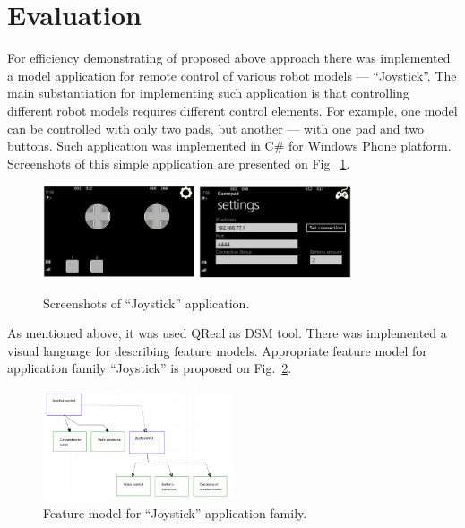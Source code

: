 \documentclass[conference]{IEEEtran}
\begin{document}
\section{Evaluation}
\label{chapter:evaluation}
For efficiency demonstrating of proposed above approach there was implemented a model application for  remote control of various robot models --- ``Joystick''. The main substantiation for implementing such application is that controlling different robot models requires different control elements. For example, one model can be controlled with only two pads, but another --- with one pad and two buttons. Such application was implemented in C\# for Windows Phone platform. Screenshots of this simple application are presented on Fig.~\ref{image:joystick}. 

\begin{figure}[t]
	\centering
	\includegraphics[width=0.4\textwidth]{joystick1.png}
	\includegraphics[width=0.4\textwidth]{joystick2.png}
	\caption{Screenshots of ``Joystick'' application.}
	\label{image:joystick}
\end{figure}

As mentioned above, it was used QReal as DSM tool. There was implemented a visual language for describing feature models. Appropriate feature model for application family ``Joystick'' is proposed on Fig.~\ref{image:joystickFeatureModel}.

\begin{figure}[H]
	\centering
	\includegraphics[width=0.5\textwidth]{joystickFeatureModel.png}
	\caption{Feature model for ``Joystick'' application family.}
	\label{image:joystickFeatureModel}
\end{figure}
\end{document}
